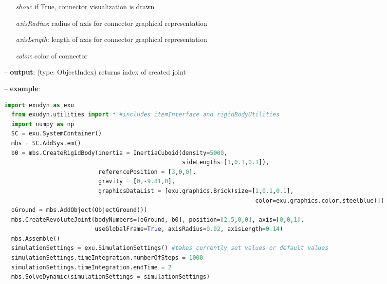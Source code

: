 \begin{itemize}[leftmargin=0.7cm]
\begin{itemize}[leftmargin=1.2cm]
\item[]{\it show}: if True, connector visualization is drawn
\item[]{\it axisRadius}: radius of axis for connector graphical representation
\item[]{\it axisLength}: length of axis for connector graphical representation
\item[]{\it color}: color of connector
\end{itemize}
\item[--]
{\bf output}: (type: ObjectIndex) returns index of created joint
\item[--]
{\bf example}: \vspace{-12pt}\ei\begin{lstlisting}[language=Python, xleftmargin=36pt]
  import exudyn as exu
  from exudyn.utilities import * #includes itemInterface and rigidBodyUtilities
  import numpy as np
  SC = exu.SystemContainer()
  mbs = SC.AddSystem()
  b0 = mbs.CreateRigidBody(inertia = InertiaCuboid(density=5000,
                                                   sideLengths=[1,0.1,0.1]),
                           referencePosition = [3,0,0],
                           gravity = [0,-9.81,0],
                           graphicsDataList = [exu.graphics.Brick(size=[1,0.1,0.1],
                                                                        color=exu.graphics.color.steelblue)])
  oGround = mbs.AddObject(ObjectGround())
  mbs.CreateRevoluteJoint(bodyNumbers=[oGround, b0], position=[2.5,0,0], axis=[0,0,1],
                          useGlobalFrame=True, axisRadius=0.02, axisLength=0.14)
  mbs.Assemble()
  simulationSettings = exu.SimulationSettings() #takes currently set values or default values
  simulationSettings.timeIntegration.numberOfSteps = 1000
  simulationSettings.timeIntegration.endTime = 2
  mbs.SolveDynamic(simulationSettings = simulationSettings)
\end{lstlisting}\vspace{-24pt}\bi\item[]\vspace{-24pt}\vspace{12pt}\end{itemize}
%

